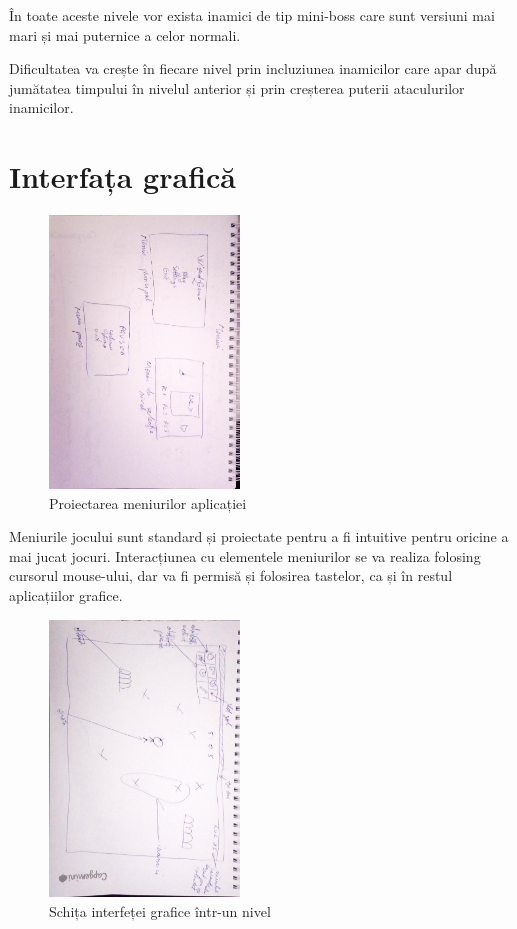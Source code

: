 \documentclass{article}
\begin{document}
    În toate aceste nivele vor exista inamici de tip mini-boss care sunt versiuni mai mari și mai
    puternice a celor normali.

    Dificultatea va crește în fiecare nivel prin incluziunea inamicilor care apar după jumătatea
    timpului în nivelul anterior și prin creșterea puterii ataculurilor inamicilor.

    \section{Interfața grafică}

    \begin{figure}[H]
        \includegraphics[width=0.45\textwidth, angle=90]{designing-menus}
        \centering
        \caption{Proiectarea meniurilor aplicației}
    \end{figure}

    Meniurile jocului sunt standard și proiectate pentru a fi intuitive pentru oricine a mai jucat
    jocuri. Interacțiunea cu elementele meniurilor se va realiza folosing cursorul mouse-ului, dar
    va fi permisă și folosirea tastelor, ca și în restul aplicațiilor grafice.

    \begin{figure}[H]
        \includegraphics[width=0.45\textwidth, angle=90]{designing-level-ui}
        \centering
        \caption{Schița interfeței grafice într-un nivel}
    \end{figure}
\end{document}
